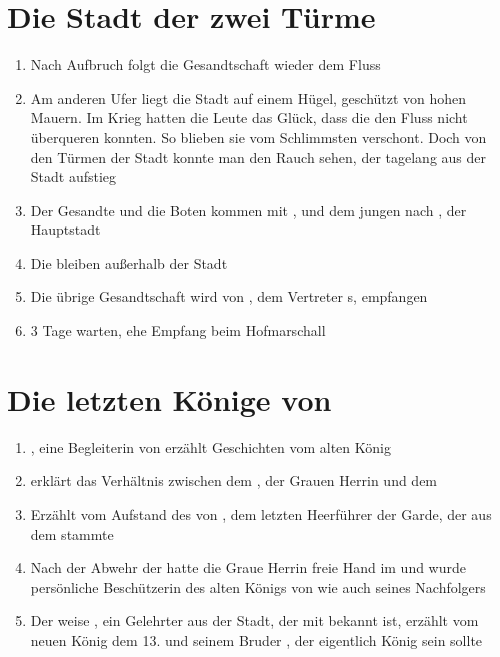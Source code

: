 \documentclass[12pt,a4paper,onecolumn,oneside,ngerman]{book}
\begin{document}
\chapter[Die Stadt der zwei Türme]{Die Stadt der zwei Türme}
\begin{enumerate}
  \item Nach Aufbruch folgt die Gesandtschaft wieder dem Fluss {\Rhin}
  \item Am anderen Ufer liegt die Stadt {\Helin} auf einem Hügel, geschützt von hohen Mauern. Im Krieg hatten die Leute das Glück, dass die {\Eislaufer} den Fluss nicht überqueren konnten. So blieben sie vom Schlimmsten verschont. Doch von den Türmen der Stadt konnte man den Rauch sehen, der tagelang aus der Stadt {\Golrin} aufstieg
  \item Der Gesandte und die Boten kommen mit {\Sena}, {\Molitor} und  dem jungen {\Bangiri} nach {\Rhin}, der Hauptstadt 
  \item Die {\Schattenlaufer} bleiben außerhalb der Stadt
  \item Die übrige Gesandtschaft wird von {\Habino}, dem Vertreter {\Lobarn}s, empfangen
  \item 3 Tage warten, ehe Empfang beim Hofmarschall
\end{enumerate}

\chapter[Die Geschichte des Königshauses]{Die letzten Könige von {\Rhingell}}
\begin{enumerate}
  \item {\Theodora}, eine Begleiterin von {\Arn} erzählt Geschichten vom alten König
  \item erklärt das Verhältnis zwischen dem {\Enland}, der Grauen Herrin und dem {\Rhinland}
  \item Erzählt vom Aufstand des {\Arwed} von {\Tern}, dem letzten Heerführer der Garde, der aus dem {\Enland} stammte
  \item Nach der Abwehr der {\Eisleute} hatte die Graue Herrin freie Hand im {\Enland} und wurde persönliche Beschützerin des alten Königs von {\Rhingell} wie auch seines Nachfolgers
  \item Der weise {\Valem}, ein Gelehrter aus der Stadt, der mit {\Habino} bekannt ist, erzählt vom neuen König {\Palemus} dem 13. und seinem Bruder {\Kalemus}, der eigentlich König sein sollte
\end{enumerate}
\end{document}
